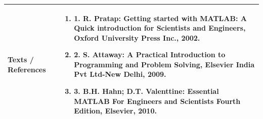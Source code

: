 \documentclass[11pt,a4paper]{article}
\begin{document}
\vspace{8pt}
\renewcommand{\arraystretch}{1.3}
\begin{tabularx}{\textwidth}{|p{3.2cm}|X|}
\hline
\textbf{Texts / References} & \begin{enumerate}[leftmargin=*,noitemsep,topsep=2pt]  \item 1. R. Pratap: Getting started with MATLAB: A Quick introduction for Scientists and Engineers,  Oxford University Press Inc., 2002.  \item 2. S. Attaway: A Practical Introduction to Programming and Problem Solving, Elsevier India Pvt  Ltd-New Delhi, 2009.  \item 3. B.H. Hahn; D.T. Valenttine: Essential MATLAB For Engineers and Scientists Fourth Edition,  Elsevier, 2010.\end{enumerate} \\
\hline
\end{tabularx}
\clearpage
\end{document}

